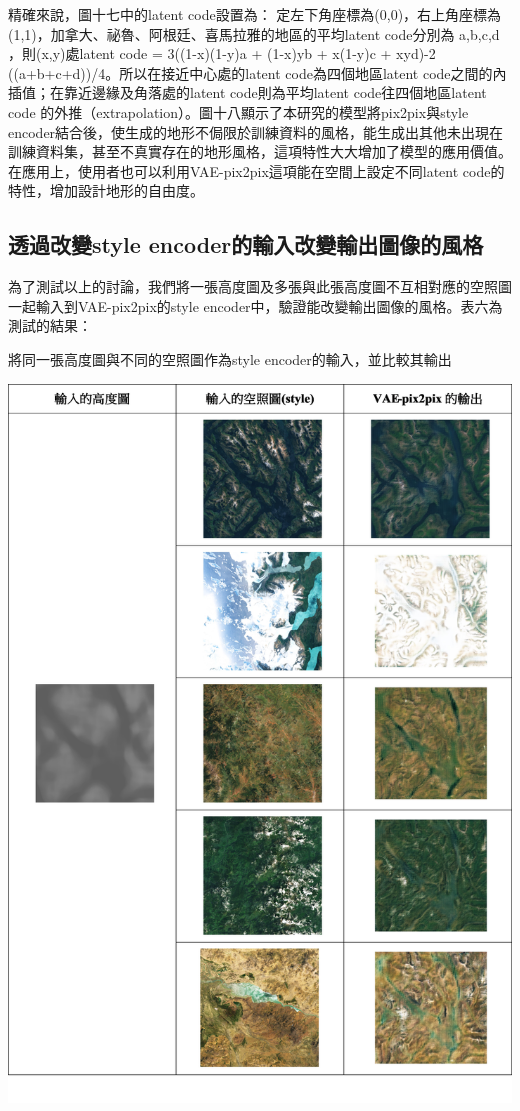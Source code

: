 \documentclass[a4paper, 12pt]{article}
\begin{document}
精確來說，圖十七中的latent code設置為：
定左下角座標為(0,0)，右上角座標為(1,1)，加拿大、祕魯、阿根廷、喜馬拉雅的地區的平均latent code分別為 a,b,c,d ，則(x,y)處latent code = 3((1-x)(1-y)a + (1-x)yb + x(1-y)c + xyd)-2 ((a+b+c+d))/4。所以在接近中心處的latent code為四個地區latent code之間的內插值；在靠近邊緣及角落處的latent code則為平均latent code往四個地區latent code 的外推（extrapolation）。圖十八顯示了本研究的模型將pix2pix與style encoder結合後，使生成的地形不侷限於訓練資料的風格，能生成出其他未出現在訓練資料集，甚至不真實存在的地形風格，這項特性大大增加了模型的應用價值。
在應用上，使用者也可以利用VAE-pix2pix這項能在空間上設定不同latent code的特性，增加設計地形的自由度。


\subsection{透過改變style encoder的輸入改變輸出圖像的風格}
為了測試以上的討論，我們將一張高度圖及多張與此張高度圖不互相對應的空照圖一起輸入到VAE-pix2pix的style encoder中，驗證能改變輸出圖像的風格。表六為測試的結果：

\begin{table}[htbp]
    \centering
    \caption{將同一張高度圖與不同的空照圖作為style encoder的輸入，並比較其輸出}
    \label{tab:6}
    \includegraphics[width=0.8\linewidth]{fig/tab6.jpg}
\end{table}
\end{document}
